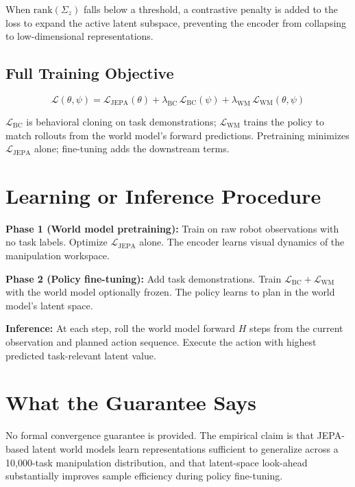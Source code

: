 \documentclass[10pt,twocolumn]{article}
\begin{document}
When $\mathrm{rank}(\Sigma_z)$ falls below a threshold, a contrastive penalty is added to the loss to expand the active latent subspace, preventing the encoder from collapsing to low-dimensional representations.

\subsection*{Full Training Objective}

\begin{equation}
\mathcal{L}(\theta, \psi) = \mathcal{L}_{\mathrm{JEPA}}(\theta) + \lambda_{\mathrm{BC}}\,\mathcal{L}_{\mathrm{BC}}(\psi) + \lambda_{\mathrm{WM}}\,\mathcal{L}_{\mathrm{WM}}(\theta, \psi)
\label{eq:full}
\end{equation}

$\mathcal{L}_{\mathrm{BC}}$ is behavioral cloning on task demonstrations; $\mathcal{L}_{\mathrm{WM}}$ trains the policy to match rollouts from the world model's forward predictions.
Pretraining minimizes $\mathcal{L}_{\mathrm{JEPA}}$ alone; fine-tuning adds the downstream terms.

\section{Learning or Inference Procedure}

\textbf{Phase 1 (World model pretraining):}
Train on raw robot observations with no task labels.
Optimize $\mathcal{L}_{\mathrm{JEPA}}$ alone.
The encoder learns visual dynamics of the manipulation workspace.

\textbf{Phase 2 (Policy fine-tuning):}
Add task demonstrations.
Train $\mathcal{L}_{\mathrm{BC}} + \mathcal{L}_{\mathrm{WM}}$ with the world model optionally frozen.
The policy learns to plan in the world model's latent space.

\textbf{Inference:}
At each step, roll the world model forward $H$ steps from the current observation and planned action sequence.
Execute the action with highest predicted task-relevant latent value.

\section{What the Guarantee Says}

No formal convergence guarantee is provided.
The empirical claim is that JEPA-based latent world models learn representations sufficient to generalize across a 10,000-task manipulation distribution, and that latent-space look-ahead substantially improves sample efficiency during policy fine-tuning.
\end{document}
